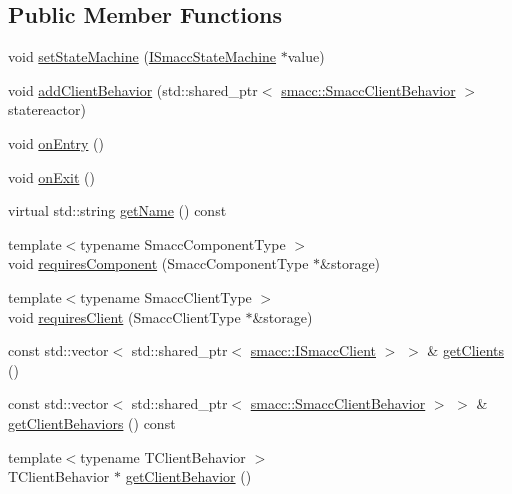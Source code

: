 \subsection*{Public Member Functions}
\begin{DoxyCompactItemize}
\item 
void \hyperlink{classsmacc_1_1IOrthogonal_a4ebfb1945e5b2ad505be791f9e31b843}{set\+State\+Machine} (\hyperlink{classsmacc_1_1ISmaccStateMachine}{I\+Smacc\+State\+Machine} $\ast$value)
\item 
void \hyperlink{classsmacc_1_1IOrthogonal_a19884fe511c71996759c3fe0d2a41251}{add\+Client\+Behavior} (std\+::shared\+\_\+ptr$<$ \hyperlink{classsmacc_1_1SmaccClientBehavior}{smacc\+::\+Smacc\+Client\+Behavior} $>$ statereactor)
\item 
void \hyperlink{classsmacc_1_1IOrthogonal_a06e10756e7c443261fe6e762c3cc9cc4}{on\+Entry} ()
\item 
void \hyperlink{classsmacc_1_1IOrthogonal_a5ea636328e956baa5e4984a2605c6333}{on\+Exit} ()
\item 
virtual std\+::string \hyperlink{classsmacc_1_1IOrthogonal_a78be582fea6f2c63549982dd9ba925de}{get\+Name} () const 
\item 
{\footnotesize template$<$typename Smacc\+Component\+Type $>$ }\\void \hyperlink{classsmacc_1_1IOrthogonal_a687a76b9c977ab0ded9cd5f242c59234}{requires\+Component} (Smacc\+Component\+Type $\ast$\&storage)
\item 
{\footnotesize template$<$typename Smacc\+Client\+Type $>$ }\\void \hyperlink{classsmacc_1_1IOrthogonal_af1f9cb7aa36255e6bf930613b82ad85c}{requires\+Client} (Smacc\+Client\+Type $\ast$\&storage)
\item 
const std\+::vector$<$ std\+::shared\+\_\+ptr$<$ \hyperlink{classsmacc_1_1ISmaccClient}{smacc\+::\+I\+Smacc\+Client} $>$ $>$ \& \hyperlink{classsmacc_1_1IOrthogonal_adbcc92186bc8eecf4c61313b1e046213}{get\+Clients} ()
\item 
const std\+::vector$<$ std\+::shared\+\_\+ptr$<$ \hyperlink{classsmacc_1_1SmaccClientBehavior}{smacc\+::\+Smacc\+Client\+Behavior} $>$ $>$ \& \hyperlink{classsmacc_1_1IOrthogonal_a0f48aa3c66b543c8647dab609baf3d14}{get\+Client\+Behaviors} () const 
\item 
{\footnotesize template$<$typename T\+Client\+Behavior $>$ }\\T\+Client\+Behavior $\ast$ \hyperlink{classsmacc_1_1IOrthogonal_a77a3355d9ad40c1a937d0b2cd23bd581}{get\+Client\+Behavior} ()
\end{DoxyCompactItemize}
